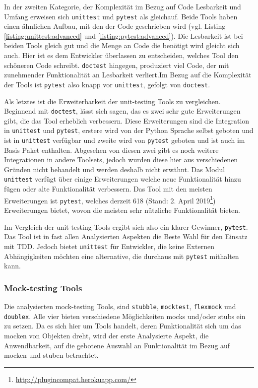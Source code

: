 In der zweiten Kategorie, der Komplexität im Bezug auf Code Lesbarkeit und
Umfang erweisen sich \lstinline{unittest} und \lstinline{pytest} als gleichauf.
Beide Tools haben einen ähnlichen Aufbau, mit den der Code geschrieben wird
(vgl. Listing \ref{listing:unittest:advanced} und
\ref{listing:pytest:advanced}). Die Lesbarkeit ist bei beiden Tools gleich gut
und die Menge an Code die benötigt wird gleicht sich auch. Hier ist es dem
Entwickler überlassen zu entscheiden, welches Tool den schöneren Code schreibt.
\lstinline{doctest} hingegen, produziert viel Code, der mit zunehmender
Funktionalität an Lesbarkeit verliert.Im Bezug auf die Komplexität der Tools
ist \lstinline{pytest} also knapp vor \lstinline{unittest}, gefolgt von
\lstinline{doctest}.
\newline

Als letztes ist die Erweiterbarkeit der unit-testing Tools zu vergleichen.
Beginnend mit \lstinline{doctest}, lässt sich sagen, das es zwei sehr gute
Erweiterungen gibt, die das Tool erheblich verbessern. Diese Erweiterungen sind
die Integration in \lstinline{unittest} und \lstinline{pytest}, erstere wird
von der Python Sprache selbst geboten und ist in \lstinline{unittest} verfügbar
und zweite wird von \lstinline{pytest} geboten und ist auch im Basis Paket
enthalten. Abgesehen von diesen zwei gibt es noch weitere Integrationen in
andere Toolsets, jedoch wurden diese hier aus verschiedenen Gründen nicht
behandelt und werden deshalb nicht erwähnt. Das Modul \lstinline{unittest}
verfügt über einige Erweiterungen welche neue Funktionalität hinzu fügen oder
alte Funktionalität verbessern. Das Tool mit den meisten Erweiterungen ist
\lstinline{pytest}, welches derzeit 618 (Stand: 2. April
2019\footnote{\url{http://plugincompat.herokuapp.com/}}) Erweiterungen
bietet, wovon die meisten sehr nützliche Funktionalität bieten.
\newline

Im Vergleich der unit-testing Tools ergibt sich also ein klarer Gewinner,
\lstinline{pytest}. Das Tool ist in fast allen Analysierten Aspekten die Beste
Wahl für den Einsatz mit TDD. Jedoch bietet \lstinline{unittest} für
Entwickler, die keine Externen Abhängigkeiten möchten eine alternative, die
durchaus mit \lstinline{pytest} mithalten kann.

\subsubsection{Mock-testing Tools}\label{vergleich:mock}
Die analysierten \gls{mock}-testing Tools, sind \lstinline{stubble},
\lstinline{mocktest}, \lstinline{flexmock} und \lstinline{doublex}. Alle vier
bieten verschiedene Möglichkeiten \Glspl{mock} und/oder \Glspl{stub} ein zu
setzen. Da es sich hier um Tools handelt, deren Funktionalität sich um das
\gls{mock}en von Objekten dreht, wird der erste Analysierte Aspekt, die
Anwendbarkeit, auf die gebotene Auswahl an Funktionalität im Bezug auf
\gls{mock}en und \gls{stub}en betrachtet.

